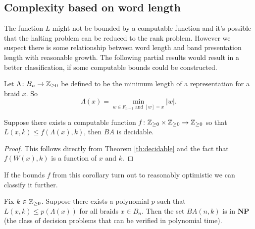\documentclass[12pt]{thesis}
\begin{document}
\subsection{Complexity based on word length}

The function $L$ might not be bounded by a computable function
and it's possible that the halting problem can be reduced to the rank problem.
However we suspect there is some relationship
between word length and band presentation length with reasonable
growth. The following partial results would result
in a better classification, if some computable
bounds could be constructed.

Let $\Lambda \colon B_{n} \rightarrow \mathbb{Z}_{\geq 0}$  be defined
to be the minimum length of a representation for a braid $x$.
So 
\begin{equation}
    \Lambda(x) = \min_{w \in F_{n-1} \text{ and } [w] = x}  |w|.
\end{equation}

\begin{corollary}
    Suppose there exists a computable function $f \colon \mathbb{Z}_{\geq 0} \times \mathbb{Z}_{\geq 0} \rightarrow \mathbb{Z}_{\geq 0}$ so
    that $L(x, k) \leq f(\Lambda(x), k)$,
    then $BA$ is decidable.
\end{corollary}

\begin{proof}
    This follows directly from Theorem \ref{th:decidable} and the fact that $f(W(x), k)$ is a function of $x$ and $k$.
\end{proof}

If the bounds $f$ from this corollary turn out to reasonably optimistic we can classify it further.

\begin{theorem}
    Fix $k \in \mathbb{Z}_{\geq 0}$.
    Suppose there exists a polynomial $p$ such that 
    $L(x, k) \leq p(\Lambda(x))$ for all braids $x \in B_{n}$.
    Then the set $BA(n, k)$ is in $\textbf{NP}$ (the class of decision problems that can be verified in polynomial time).
\end{theorem}
\end{document}

